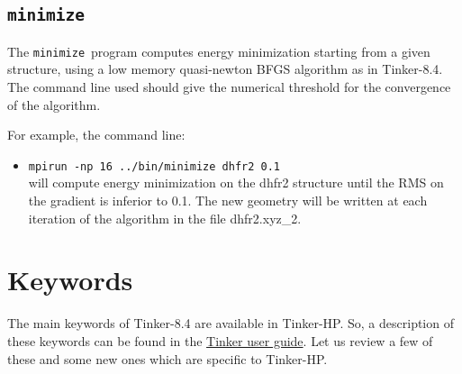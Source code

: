 \documentclass[peerreview]{IEEEtran}
\def\minimize{\texttt{minimize}}
\def\mpirun{\texttt{mpirun -np}}
\def\baoabpiston{\textbf{\textsc{BaoabPiston}}}
\newlength{\mylen}
\begin{document}
\subsection{\minimize}
The \minimize\ program computes energy minimization starting from a given structure, using a low memory quasi-newton BFGS algorithm as in Tinker-8.4. The command line used should give the numerical threshold for the convergence of the algorithm.

For example, the command line:
\begin{itemize}
\item []\mpirun\texttt{  16 ../bin/minimize dhfr2 0.1} \\
will compute energy minimization on the dhfr2 structure until the RMS on the gradient is inferior to 0.1. The new geometry will be written at each iteration of the algorithm in the file dhfr2.xyz\_2.
\end{itemize}
\section{Keywords}
The main keywords of Tinker-8.4 are available in Tinker-HP. So, a description of these keywords can be found in the \href{https://dasher.wustl.edu/tinker/downloads/guide.pdf}{Tinker user guide}. Let us review a few of these and some new ones which are specific to  Tinker-HP.

\settowidth{\mylen}{\baoabpiston}
\end{document}
